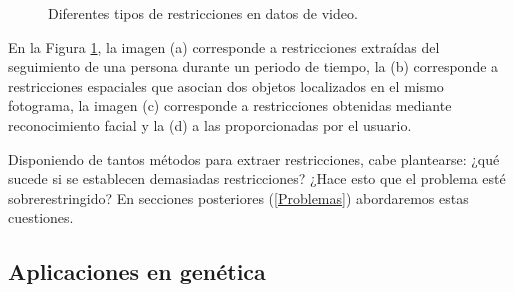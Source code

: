 \begin{figure}[bth]
	\myfloatalign
	\quad
	 \quad
	\quad
	\caption[Diferentes tipos de restricciones en datos de video.]{Diferentes tipos de restricciones en datos de video. \cite{Yan:2006} \cite{Survey:2007}}\label{fig:figure12}
\end{figure}

En la Figura \ref{fig:figure12}, la imagen (a) corresponde a restricciones extraídas del seguimiento de una persona durante un periodo de tiempo, la (b) corresponde a restricciones espaciales que asocian dos objetos localizados en el mismo fotograma, la imagen (c) corresponde a restricciones obtenidas mediante reconocimiento facial y la (d) a las proporcionadas por el usuario.

Disponiendo de tantos métodos para extraer restricciones, cabe plantearse: ¿qué sucede si se establecen demasiadas restricciones? ¿Hace esto que el problema esté sobrerestringido? En secciones posteriores (\ref{Problemas}) abordaremos estas cuestiones.

\subsection{Aplicaciones en genética}

